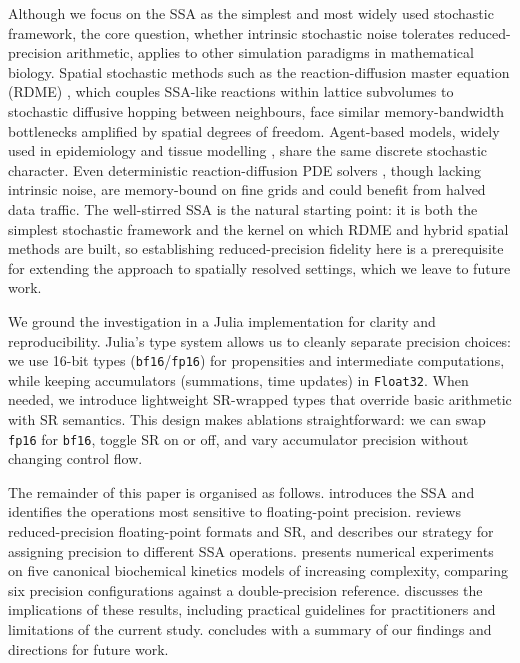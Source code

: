 \documentclass{article}
\begin{document}
Although we focus on the SSA as the simplest and most widely used stochastic framework, the core question, whether intrinsic stochastic noise tolerates reduced-precision arithmetic, applies to other simulation paradigms in mathematical biology. Spatial stochastic methods such as the reaction-diffusion master equation (RDME) \cite{engblom2009}, which couples SSA-like reactions within lattice subvolumes to stochastic diffusive hopping between neighbours, face similar memory-bandwidth bottlenecks amplified by spatial degrees of freedom. Agent-based models, widely used in epidemiology and tissue modelling \cite{an2009}, share the same discrete stochastic character. Even deterministic reaction-diffusion PDE solvers \cite{hundsdorfer2003}, though lacking intrinsic noise, are memory-bound on fine grids and could benefit from halved data traffic. The well-stirred SSA is the natural starting point: it is both the simplest stochastic framework and the kernel on which RDME and hybrid spatial methods are built, so establishing reduced-precision fidelity here is a prerequisite for extending the approach to spatially resolved settings, which we leave to future work.

We ground the investigation in a Julia implementation for clarity and reproducibility. Julia's type system allows us to cleanly separate precision choices: we use 16-bit types (\texttt{bf16}/\texttt{fp16}) for propensities and intermediate computations, while keeping accumulators (summations, time updates) in \texttt{Float32}. When needed, we introduce lightweight SR-wrapped types that override basic arithmetic with SR semantics. This design makes ablations straightforward: we can swap \texttt{fp16} for \texttt{bf16}, toggle SR on or off, and vary accumulator precision without changing control flow.

The remainder of this paper is organised as follows.  introduces the SSA and identifies the operations most sensitive to floating-point precision.  reviews reduced-precision floating-point formats and SR, and describes our strategy for assigning precision to different SSA operations.  presents numerical experiments on five canonical biochemical kinetics models of increasing complexity, comparing six precision configurations against a double-precision reference.  discusses the implications of these results, including practical guidelines for practitioners and limitations of the current study.  concludes with a summary of our findings and directions for future work.
\end{document}
